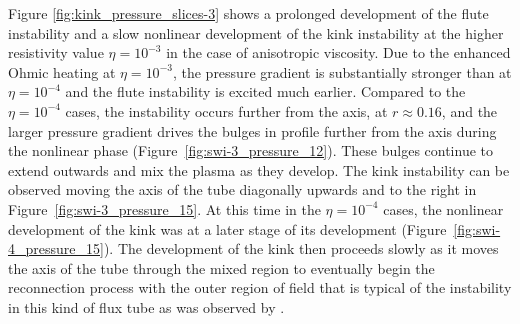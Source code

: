 \documentclass[fleqn,usenatbib]{mnras}
\newcommand{\revcite}[1]{{\color{red} \underline{#1}}}
\begin{document}
Figure \ref{fig:kink_pressure_slices-3} shows a prolonged development of the
flute instability and a slow nonlinear development of the kink instability at
the higher resistivity value $\eta=10^{-3}$ in the case of anisotropic
viscosity. Due to the enhanced Ohmic heating at $\eta=10^{-3}$, the pressure
gradient is substantially stronger than at $\eta=10^{-4}$ and the flute
instability is excited much earlier. Compared to the $\eta=10^{-4}$ cases, the
instability occurs further from the axis, at $r\approx0.16$, and the larger
pressure gradient drives the bulges in profile further from the axis during the
nonlinear phase (Figure~\ref{fig:swi-3_pressure_12}). These bulges continue to
extend outwards and mix the plasma as they develop. The kink instability can be
observed moving the axis of the tube diagonally upwards and to the right in
Figure~\ref{fig:swi-3_pressure_15}. At this time in the $\eta=10^{-4}$ cases,
the nonlinear development of the kink was at a later stage of its development
(Figure~\ref{fig:swi-4_pressure_15}). The development of the kink then proceeds
slowly as it moves the axis of the tube through the mixed region to eventually
begin the reconnection process with the outer region of field that is typical
of the instability in this kind of flux tube as was observed by \revcite{\citet{quinnEffectAnisotropicViscosity2020}}. 
\end{document}
